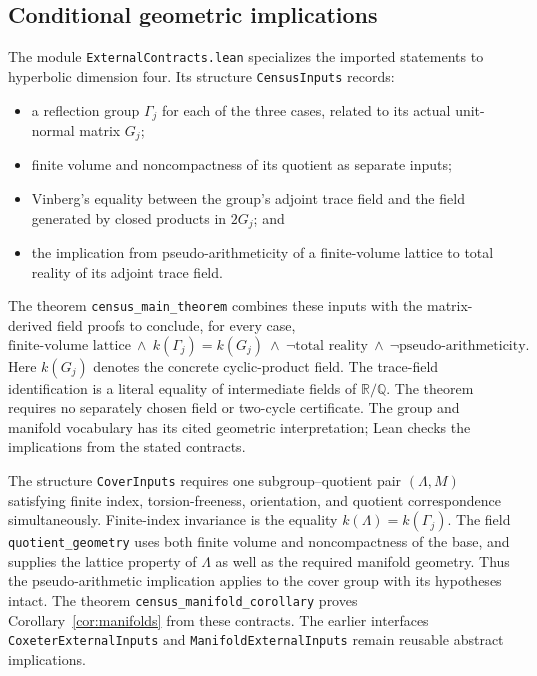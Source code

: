\documentclass[11pt]{article}
\numberwithin{equation}{section}
\theoremstyle{definition}
\theoremstyle{remark}
\newcommand{\Q}{\mathbb{Q}}
\newcommand{\R}{\mathbb{R}}
\newcommand{\code}[1]{\texttt{#1}}
\begin{document}
\subsection{Conditional geometric implications}

The module \code{ExternalContracts.lean} specializes the imported statements
to hyperbolic dimension four.  Its structure \code{CensusInputs} records:
\begin{itemize}[leftmargin=2em]
\item a reflection group \(\Gamma_j\) for each of the three cases, related
  to its actual unit-normal matrix \(G_j\);
\item finite volume and noncompactness of its quotient as separate inputs;
\item Vinberg's equality between the group's adjoint trace field and the
  field generated by closed products in \(2G_j\); and
\item the implication from pseudo-arithmeticity of a finite-volume lattice
  to total reality of its adjoint trace field.
\end{itemize}
The theorem \code{census\_main\_theorem} combines these inputs with the
matrix-derived field proofs to conclude, for every case,
\[
 \text{finite-volume lattice}\ \wedge\
 k(\Gamma_j)=k(G_j)\ \wedge\
 \neg\text{total reality}\ \wedge\
 \neg\text{pseudo-arithmeticity}.
\]
Here \(k(G_j)\) denotes the concrete cyclic-product field.  The trace-field
identification is a literal equality of intermediate fields of \(\R/\Q\).
The theorem requires no separately chosen field or two-cycle certificate.
The group and manifold vocabulary has its cited geometric interpretation;
Lean checks the implications from the stated contracts.

The structure \code{CoverInputs} requires one subgroup--quotient pair
\((\Lambda,M)\) satisfying finite index, torsion-freeness, orientation,
and quotient correspondence simultaneously.  Finite-index invariance is
the equality \(k(\Lambda)=k(\Gamma_j)\).  The field
\code{quotient\_geometry} uses both finite volume and noncompactness of the
base, and supplies the lattice property of \(\Lambda\) as well as the
required manifold geometry.  Thus the pseudo-arithmetic implication applies
to the cover group with its hypotheses intact.  The theorem
\code{census\_manifold\_corollary} proves Corollary~\ref{cor:manifolds}
from these contracts.  The earlier interfaces \code{CoxeterExternalInputs}
and \code{ManifoldExternalInputs} remain reusable abstract implications.
\end{document}
